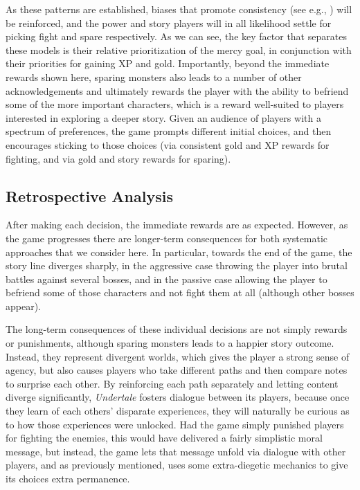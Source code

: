 \documentclass[arts,article,submit,moreauthors,pdftex,10pt,a4paper]{Definitions/mdpi}
\begin{document}
As these patterns are established, biases that promote consistency (see e.g., \cite{brehm1956postdecision,mather2000misremembrance,hall2012lifting}) will be reinforced, and the power and story players will in all likelihood settle for picking fight and spare respectively.
%
As we can see, the key factor that separates these models is their relative prioritization of the mercy goal, in conjunction with their priorities for gaining XP and gold.
%
Importantly, beyond the immediate rewards shown here, sparing monsters also leads to a number of other acknowledgements and ultimately rewards the player with the ability to befriend some of the more important characters, which is a reward well-suited to players interested in exploring a deeper story.
%
Given an audience of players with a spectrum of preferences, the game prompts different initial choices, and then encourages sticking to those choices (via consistent gold and XP rewards for fighting, and via gold and story rewards for sparing).


\subsection{Retrospective Analysis}

After making each decision, the immediate rewards are as expected.
%
However, as the game progresses there are longer-term consequences for both systematic approaches that we consider here.
%
In particular, towards the end of the game, the story line diverges sharply, in the aggressive case throwing the player into brutal battles against several bosses, and in the passive case allowing the player to befriend some of those characters and not fight them at all (although other bosses appear).


The long-term consequences of these individual decisions are not simply rewards or punishments, although sparing monsters leads to a happier story outcome.
%
Instead, they represent divergent worlds, which gives the player a strong sense of agency, but also causes players who take different paths and then compare notes to surprise each other.
%
By reinforcing each path separately and letting content diverge significantly, \emph{Undertale} fosters dialogue between its players, because once they learn of each others' disparate experiences, they will naturally be curious as to how those experiences were unlocked.
%
Had the game simply punished players for fighting the enemies, this would have delivered a fairly simplistic moral message, but instead, the game lets that message unfold via dialogue with other players, and as previously mentioned, uses some extra-diegetic mechanics to give its choices extra permanence.
\end{document}
